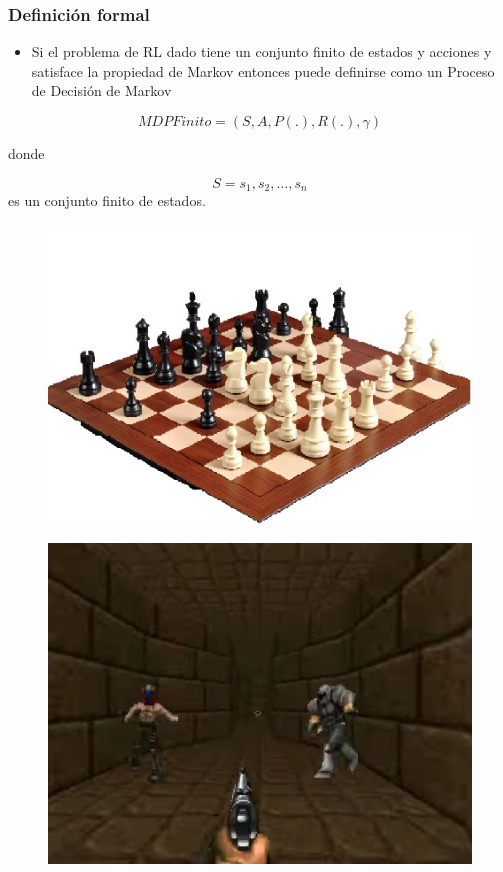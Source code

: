 \documentclass[11pt]{article}
\makeatletter
\def\maxwidth{\ifdim\Gin@nat@width>\linewidth\linewidth
    \else\Gin@nat@width\fi}
\let\Oldincludegraphics\includegraphics
\renewcommand{\includegraphics}[1]{\Oldincludegraphics[width=.8\maxwidth]{#1}}
\providecommand{\tightlist}{%
      \setlength{\itemsep}{0pt}\setlength{\parskip}{0pt}}
\makeatother
\begin{document}
    \subsubsection{Definición formal}\label{definiciuxf3n-formal}

\begin{itemize}
\tightlist
\item
  Si el problema de RL dado tiene un conjunto finito de estados y
  acciones y satisface la propiedad de Markov entonces puede definirse
  como un Proceso de Decisión de Markov
\end{itemize}

\begin{equation}
MDPFinito = (S, A, P(.), R(.), γ)
\end{equation}

donde

\[ S = {s_{1}, s_{2}, ..., s_{n}} \] es un conjunto finito de estados.

\begin{figure}
\centering
\includegraphics{images/ajedrez-estado.jpg}
\caption{}
\end{figure}

\begin{figure}
\centering
\includegraphics{images/doom-estado.png}
\caption{}
\end{figure}
\end{document}
